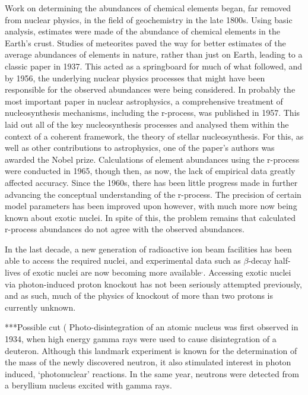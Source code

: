 \documentclass[a4paper,12pt]{article}
\begin{document}
Work on determining the abundances of chemical elements began, far removed from nuclear physics, in the field of geochemistry in the late 1800s\cite{clarke}. Using basic analysis, estimates were made of the abundance of chemical elements in the Earth's crust. Studies of meteorites paved the way for better estimates of the average abundances of elements in nature, rather than just on Earth, leading to a classic paper in 1937\cite{goldschmidt}{}. This acted as a springboard for much of what followed, and by 1956, the underlying nuclear physics processes that might have been responsible for the observed abundances were being considered\cite{suess}{}. In probably the most important paper in nuclear astrophysics, a comprehensive treatment of nucleosynthesis mechanisms, including the r-process, was published in 1957\cite{b2fh}{}. This laid out all of the key nucleosynthesis processes and analysed them within the context of a coherent framework, the theory of stellar nucleosynthesis. For this, as well as other contributions to astrophysics, one of the paper's authors was awarded the Nobel prize. Calculations of element abundances using the r-process were conducted in 1965\cite{seeger}{}, though then, as now, the lack of empirical data greatly affected accuracy. Since the 1960s, there has been little progress made in further advancing the conceptual understanding of the r-process. The precision of certain model parameters has been improved upon however, with much more now being known about exotic nuclei\cite{moller}{}. In spite of this, the problem remains that calculated r-process abundances do not agree with the observed abundances.

In the last decade, a new generation of radioactive ion beam facilities has been able to access the required nuclei, and experimental data such as $\beta$-decay half-lives of exotic nuclei are now becoming more available\cite{hosmer}{}$^{,}$\cite{lorusso}{}. Accessing exotic nuclei via photon-induced proton knockout has not been seriously attempted previously, and as such, much of the physics of knockout of more than two protons is currently unknown.

***Possible cut (
Photo-disintegration of an atomic nucleus was first observed in 1934, when high energy gamma rays were used to cause disintegration of a deuteron\cite{chadwick}{}. Although this landmark experiment is known for the  determination of the mass of the newly discovered neutron, it also stimulated interest in photon induced, `photonuclear' reactions. In the same year, neutrons were detected from a beryllium nucleus excited with gamma rays\cite{szilard}{}.
\end{document}
